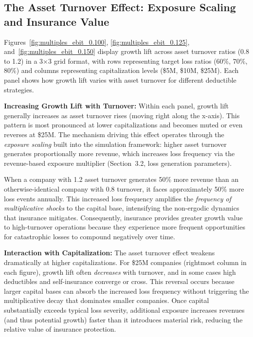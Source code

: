 \documentclass[11pt,letterpaper]{article}
\begin{document}
\subsection{The Asset Turnover Effect: Exposure Scaling and Insurance Value}

Figures~\ref{fig:multiples_ebit_0.100}, \ref{fig:multiples_ebit_0.125}, and~\ref{fig:multiples_ebit_0.150} display growth lift across asset turnover ratios (0.8 to 1.2) in a 3×3 grid format, with rows representing target loss ratios (60\%, 70\%, 80\%) and columns representing capitalization levels (\$5M, \$10M, \$25M). Each panel shows how growth lift varies with asset turnover for different deductible strategies.

\vspace{\baselineskip}

\textbf{Increasing Growth Lift with Turnover:} Within each panel, growth lift generally increases as asset turnover rises (moving right along the x-axis). This pattern is most pronounced at lower capitalizations and becomes muted or even reverses at \$25M. The mechanism driving this effect operates through the \emph{exposure scaling} built into the simulation framework: higher asset turnover generates proportionally more revenue, which increases loss frequency via the revenue-based exposure multiplier (Section~3.2, loss generation parameters).

When a company with 1.2 asset turnover generates 50\% more revenue than an otherwise-identical company with 0.8 turnover, it faces approximately 50\% more loss events annually. This increased loss frequency amplifies the \emph{frequency of multiplicative shocks} to the capital base, intensifying the non-ergodic dynamics that insurance mitigates. Consequently, insurance provides greater growth value to high-turnover operations because they experience more frequent opportunities for catastrophic losses to compound negatively over time.

\vspace{\baselineskip}

\textbf{Interaction with Capitalization:} The asset turnover effect weakens dramatically at higher capitalizations. For \$25M companies (rightmost column in each figure), growth lift often \emph{decreases} with turnover, and in some cases high deductibles and self-insurance converge or cross. This reversal occurs because larger capital bases can absorb the increased loss frequency without triggering the multiplicative decay that dominates smaller companies. Once capital substantially exceeds typical loss severity, additional exposure increases revenues (and thus potential growth) faster than it introduces material risk, reducing the relative value of insurance protection.
\end{document}
